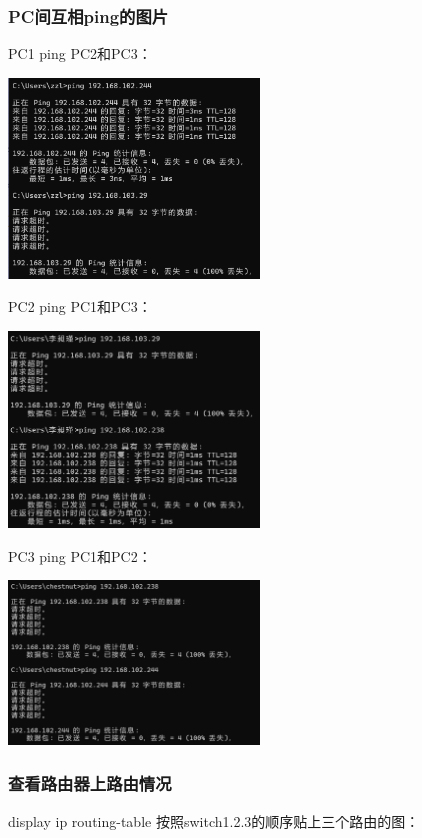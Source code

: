 \documentclass{article}
\begin{document}
\subsubsection{PC间互相ping的图片}
PC1 ping PC2和PC3：

\vspace{10pt}
\centerline{\includegraphics[width=0.5\textwidth]{3_1_images/7.png}}
\vspace{10pt}
PC2 ping PC1和PC3：

\vspace{10pt}
\centerline{\includegraphics[width=0.5\textwidth]{3_1_images/8.png}}
\vspace{10pt}
PC3 ping PC1和PC2：

\vspace{10pt}
\centerline{\includegraphics[width=0.5\textwidth]{3_1_images/9.png}}
\vspace{10pt}

\subsubsection{查看路由器上路由情况}
display ip routing-table
按照switch1.2.3的顺序贴上三个路由的图：
\end{document}
